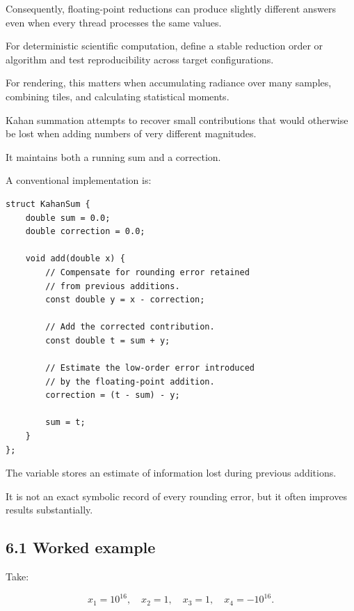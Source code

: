 Consequently, floating-point reductions can produce slightly different answers even when every thread processes the same values.

For deterministic scientific computation, define a stable reduction order or algorithm and test reproducibility across target configurations.

For rendering, this matters when accumulating radiance over many samples, combining tiles, and calculating statistical moments.

Kahan summation attempts to recover small contributions that would otherwise be lost when adding numbers of very different magnitudes.

It maintains both a running sum and a correction.

A conventional implementation is:

\begin{verbatim}
struct KahanSum {
    double sum = 0.0;
    double correction = 0.0;

    void add(double x) {
        // Compensate for rounding error retained
        // from previous additions.
        const double y = x - correction;

        // Add the corrected contribution.
        const double t = sum + y;

        // Estimate the low-order error introduced
        // by the floating-point addition.
        correction = (t - sum) - y;

        sum = t;
    }
};
\end{verbatim}

The variable  stores an estimate of information lost during previous additions.

It is not an exact symbolic record of every rounding error, but it often improves results substantially.

\begin{allmightroleexample}

\subsection{6.1 Worked example}\label{02-foundations-ii-ch028-worked-example}

\hypertarget{02-foundations-ii-ch028-worked-example}{}

Take:

\end{allmightroleexample}

\[ x_1=10^{16},\quad x_2=1,\quad x_3=1,\quad x_4=-10^{16}. \]

